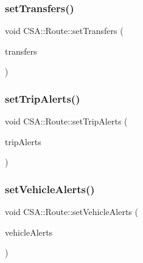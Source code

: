\mbox{\label{classCSA_1_1Route_a0977183a554295d3aaabdd3e3aa68ab4}} 
\subsubsection{\texorpdfstring{set\+Transfers()}{setTransfers()}}
{\footnotesize\ttfamily void C\+S\+A\+::\+Route\+::set\+Transfers (\begin{DoxyParamCaption}\item[{const Q\+List$<$ \mbox{\hyperlink{classCSA_1_1Transfer}{C\+S\+A\+::\+Transfer}} $\ast$$>$ \&}]{transfers }\end{DoxyParamCaption})}

\mbox{\label{classCSA_1_1Route_a0ef9be4b744e679ab9daeb8e39753f8f}} 
\subsubsection{\texorpdfstring{set\+Trip\+Alerts()}{setTripAlerts()}}
{\footnotesize\ttfamily void C\+S\+A\+::\+Route\+::set\+Trip\+Alerts (\begin{DoxyParamCaption}\item[{const Q\+List$<$ \mbox{\hyperlink{classCSA_1_1Message}{C\+S\+A\+::\+Message}} $\ast$$>$ \&}]{trip\+Alerts }\end{DoxyParamCaption})}

\mbox{\label{classCSA_1_1Route_af9373662a655881774662dd580926e50}} 
\subsubsection{\texorpdfstring{set\+Vehicle\+Alerts()}{setVehicleAlerts()}}
{\footnotesize\ttfamily void C\+S\+A\+::\+Route\+::set\+Vehicle\+Alerts (\begin{DoxyParamCaption}\item[{const Q\+List$<$ \mbox{\hyperlink{classCSA_1_1Message}{C\+S\+A\+::\+Message}} $\ast$$>$ \&}]{vehicle\+Alerts }\end{DoxyParamCaption})}

